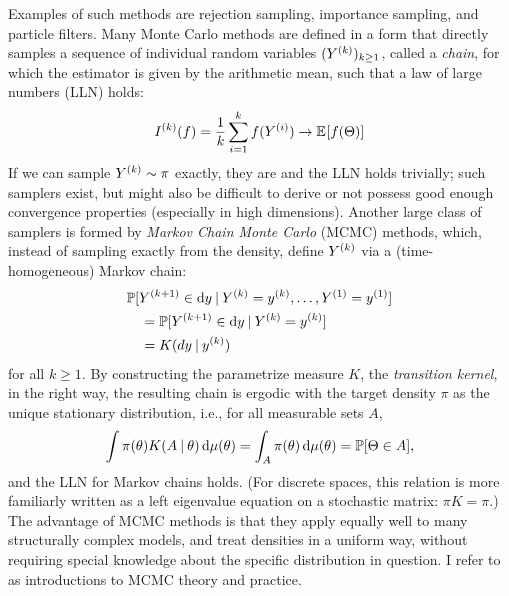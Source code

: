 Examples of such methods are rejection sampling, importance sampling, and particle filters.  Many
Monte Carlo methods are defined in a form that directly samples a sequence of individual random
variables \((Y^{(k)})_{k \ge 1}\), called a \emph{chain}, for which the estimator is given by the
arithmetic mean, such that a law of large numbers (LLN) holds:
\begin{equation}
  \label{eq:mc-lln}
  \kth{I}(f) = \frac{1}{k} \sum_{i=1}^{k} f(\kth[i]{Y}) \to \Exp{f(\Theta)}
\end{equation}
If we can sample \(Y^{(k)} \sim \pi\) exactly, they are \iid{} and the LLN holds trivially; such
samplers exist, but might also be difficult to derive or not possess good enough convergence
properties (especially in high dimensions).  Another large class of samplers is formed by
\emph{Markov Chain Monte Carlo} (MCMC) methods, which, instead of sampling exactly from the density,
define \(Y^{(k)}\) via a (time-homogeneous) Markov chain:
\begin{equation}
  \label{eq:mc-kernel}
  \begin{aligned}
    &\Prob{\kth[k+1]{Y} \in \dif y
      \given \kth{Y} = \kth{y}, \ldots, \kth[1]{Y} = \kth[1]{y}} \\
    &\quad = \Prob{\kth[k+1]{Y} \in \dif y \given \kth{Y} = \kth{y}}  \\
    &\quad = K(dy \given \kth{y}) \\
  \end{aligned}
\end{equation}
for all \(k \ge 1\).  By constructing the parametrize measure \(K\), the \emph{transition kernel},
in the right way, the resulting chain is ergodic with the target density \(\pi\) as the unique
stationary distribution, i.e., for all measurable sets \(A\),
\begin{equation}
  \label{eq:stationarity}
  \int \pi(\theta) K(A \given \theta) \dif\mu(\theta) = \int_A \pi(\theta) \dif\mu(\theta) =
  \Prob{\Theta \in A},
\end{equation}
and the LLN for Markov chains holds.  (For discrete spaces, this relation is more familiarly written
as a left eigenvalue equation on a stochastic matrix: \(\pi K = \pi\).)  The advantage of MCMC
methods is that they apply equally well to many structurally complex models, and treat densities in
a uniform way, without requiring special knowledge about the specific distribution in question.  I
refer to \textcites[chapter 6]{vihola2020lectures}{robert1999monte}[chapters 24 and
following]{murphy2012machine} as introductions to MCMC theory and practice.

